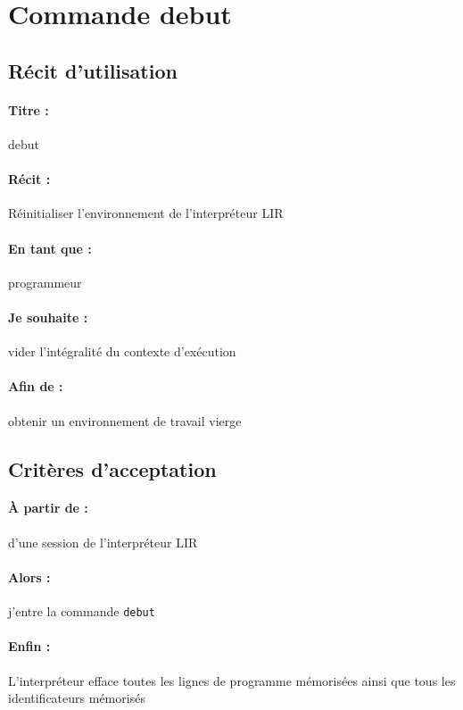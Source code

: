     \section{Commande debut}
    \subsection*{Récit d'utilisation}

    \paragraph{Titre : } debut
    \paragraph{Récit : } Réinitialiser l'environnement de l'interpréteur LIR
    \paragraph{En tant que : } programmeur
    \paragraph{Je souhaite : } vider l'intégralité du contexte d'exécution
    \paragraph{Afin de : } obtenir un environnement de travail vierge

    \subsection*{Critères d'acceptation}

    \paragraph{À partir de : } d'une session de l'interpréteur LIR
    \paragraph{Alors : } j'entre la commande \verb|debut|
    \paragraph{Enfin : } L'interpréteur efface toutes les lignes de programme
    mémorisées ainsi que tous les identificateurs mémorisés